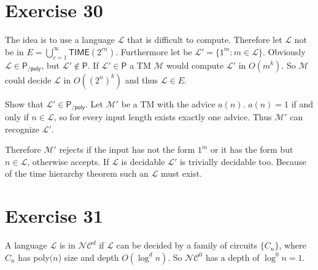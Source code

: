 \documentclass[10pt]{article}
\newcommand{\NC}{\mathcal{NC}}
\newcommand{\Ll}{\mathcal{L}}
\begin{document}
\section*{Exercise 30}
  The idea is to use a language $\Ll$ that is difficult to compute. Therefore
  let $\Ll$ not be in
  $E=\bigcup_{c=1}^{\infty} \textsf{TIME}(2^{cn})$. Furthermore let be
  $\Ll'=\{1^{m}:m\in\Ll\}$. Obviously $\Ll\in \mathsf{P_{/poly}}$, but $\Ll'\not
  \in \mathsf{P}$. If $\Ll'\in \mathsf{P}$ a TM
  $\mathcal{M}$ would compute $\Ll'$ in $O(m^{k})$. So $\mathcal{M}$ could
  decide $\Ll$ in $O((2^n)^k)$ and thus $\Ll \in E$.
  
  Show that $\Ll'\in \mathsf{P_{/poly}}$. Let $\mathcal{M}'$ be a TM with the
  advice $a(n)$. $a(n)=1$ if and only if $n\in\Ll$, so for every input length
  exists exactly one advice. Thus $\mathcal{M}'$ can
  recognize $\Ll'$.

  Therefore $\mathcal{M}'$ rejects if the input has not the form $1^m$ or it has
  the form but $n\in\Ll$, otherwise accepts. If $\Ll$ is decidable $\Ll'$ is 
  trivially decidable too. Because of the time hierarchy theorem such an $\Ll$
  must exist.

  

%
%


\section*{Exercise 31}
    A language $\Ll$ is in $\NC^{d}$ if $\Ll$ can be decided by a family of circuits
    $\{C_{n}\}$, where $C_{n}$ has poly$(n$) size and depth $O(\log^{d} n)$. So
    $\NC^{0}$ has a depth of $\log^{0} n = 1$. 
\end{document}
